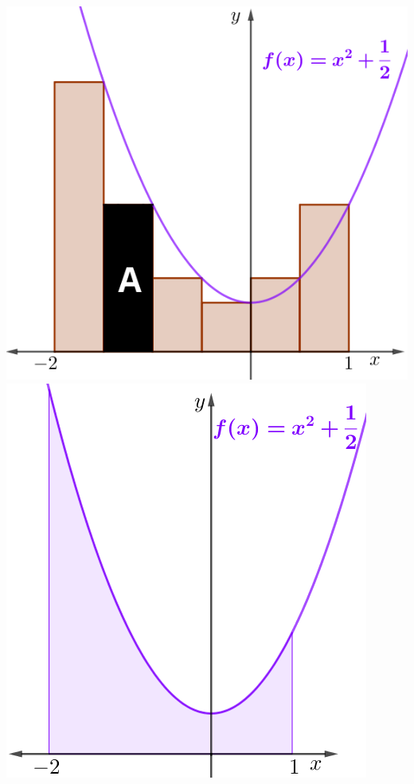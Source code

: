 \documentclass[10pt]{exam}
\begin{document}
\begin{enumerate}
\begin{center}
\includegraphics[scale=1.2]{Riemann6.png}
\hspace{0.5 cm}
\includegraphics[scale=1.2]{R3.png}    
\end{center}


\end{enumerate}
\end{document}
